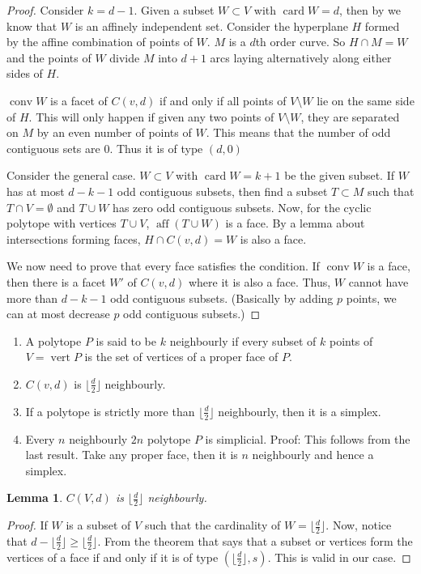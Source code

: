 \documentclass[a4paper,10pt,landscape]{article}
\newtheorem{lemma}[theorem]{Lemma}
\def\conv{\operatorname{conv}}
\def\aff{\operatorname{aff}}
\def\verti{\operatorname{vert}}
\def\card{\operatorname{card}}
\begin{document}
\begin{multicols}{3}
\begin{proof}
      Consider $k = d - 1$. Given a subset $W \subset V$ with $\card W = d$,
      then by we know that $W$ is an affinely independent set. Consider the
      hyperplane $H$ formed by the affine combination of points of $W$. $M$ is a
      $d$th order curve. So $H \cap M = W$ and the points of $W$ divide $M$ into
      $d + 1$ arcs laying alternatively along either sides of $H$.

      $\conv W$ is a facet of $C(v, d)$ if and only if all points of $V
      \setminus W$ lie on the same side of $H$. This will only happen if given
      any two points of $V \setminus W$, they are separated on $M$ by an even
      number of points of $W$. This means that the number of odd contiguous sets
      are $0$. Thus it is of type $(d, 0)$

      Consider the general case. $W \subset V$ with $\card W = k + 1$ be the
      given subset. If $W$ has at most $d - k - 1$ odd contiguous subsets, then
      find a subset $T \subset M$ such that $T \cap V = \emptyset$ and $T \cup
      W$ has zero odd contiguous subsets. Now, for the cyclic polytope with
      vertices $T \cup V$, $\aff (T \cup W)$ is a face. By a lemma about
      intersections forming faces, $H \cap C(v, d) = W$ is also a face.

      We now need to prove that every face satisfies the condition. If $\conv W$
      is a face, then there is a facet $W'$ of $C(v, d)$ where it is also a
      face. Thus, $W$ cannot have more than $d - k - 1$ odd contiguous subsets.
      (Basically by adding $p$ points, we can at most decrease $p$ odd
      contiguous subsets.)
    \end{proof}

    \begin{enumerate}
    \item A polytope $P$ is said to be $k$ neighbourly if every subset of $k$
      points of $V = \verti P$ is the set of vertices of a proper face of $P$.
    \item $C(v, d)$ is $\lfloor \frac{d}{2} \rfloor$ neighbourly.
    \item If a polytope is strictly more than $\lfloor \frac{d}{2} \rfloor$ neighbourly,
      then it is a simplex.
    \item Every $n$ neighbourly $2n$ polytope $P$ is simplicial. Proof: This
      follows from the last result. Take any proper face, then it is $n$
      neighbourly and hence a simplex.
    \end{enumerate}

    \begin{lemma}
      $C(V, d)$ is $\lfloor \frac{d}{2} \rfloor$ neighbourly.
    \end{lemma}
    \begin{proof}
      If $W$ is a subset of $V$ such that the cardinality of $W = \lfloor
      \frac{d}{2} \rfloor$. Now, notice that $d - \lfloor \frac{d}{2} \rfloor
      \ge \lfloor \frac{d}{2} \rfloor$. From the theorem that says that a subset
      or vertices form the vertices of a face if and only if it is of type
      $(\lfloor \frac{d}{2} \rfloor, s)$. This is valid in our case.
    \end{proof}


\end{multicols}
\end{document}
